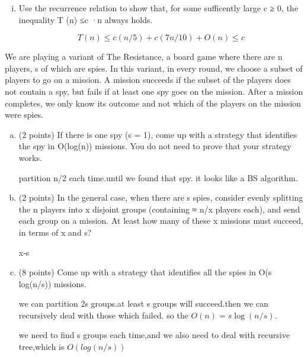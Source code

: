 \documentclass[11pt]{article}
\begin{document}
\begin{subparts}
\begin{enumerate}[i.]
        \item Use the recurrence relation to show that, for some sufficently large c ≥ 0, the
        inequality T (n) ≤c ·n always holds. \par
        \begin{solution}
            $$T(n)\leq c(n/5)+c(7n/10)+O(n) \leq c$$
        \end{solution}
    \end{enumerate}

    \item We are playing a variant of The Resistance, a board game where there are n players, s of which are spies. In this variant, in every round, we choose a subset of players to go on a mission. A mission succeeds if the subset of the players does not contain a spy, but fails if at least one spy goes on the mission. After a mission completes, we only know its outcome and not which of the players on the mission were spies. \par
    \begin{enumerate}[(a)]
        \item (2 points) If there is one spy (s = 1), come up with a strategy that identifies the spy in O(log(n)) missions. You do not need to prove that your strategy works. \par
        \begin{solution}
            partition n/2 each time.until we found that spy. it looks like a BS algorithm. \par
        \end{solution}
        
        \item (2 points) In the general case, when there are s spies, consider evenly splitting the n players into x disjoint groups (containing ≈ n/x players each), and send each group on a mission. At least how many of these x missions must succeed, in terms of x and s? \par
        \begin{solution}
            x-s
        \end{solution}

        \item (8 points) Come up with a strategy that identifies all the spies in O(s log(n/s)) missions. \par
        \begin{solution}
            we can partition 2s groups.at least s groups will succeed.then we can recursively deal with those which failed.
            so the $O(n)=s\log(n/s)$.\par
            we need to find s groups each time,and we also need to deal with recursive tree,which is $O(log(n/s))$
        \end{solution}
    \end{enumerate}

    
\end{subparts}
\end{document}
